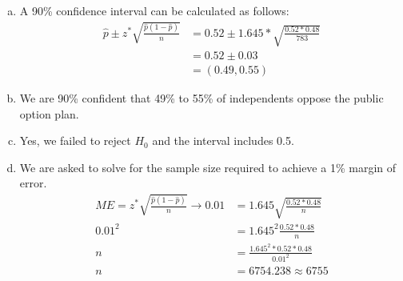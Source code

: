 %

{
\begin{enumerate}[(a)]
\item A 90\% confidence interval can be calculated as follows:
\begin{align*}
\hat{p} \pm z^* \sqrt{\frac{\hat{p} ( 1 - \hat{p})}{n}} &= 0.52 \pm 1.645 *  \sqrt{\frac{0.52 * 0.48}{783}} \\
&= 0.52 \pm 0.03 \\
&= (0.49, 0.55)
\end{align*}

\item We are 90\% confident that 49\% to 55\% of independents oppose the public option plan.

\item Yes, we failed to reject $H_0$ and the interval includes 0.5.

\item  We are asked to solve for the sample size required to achieve a 1\% margin of error. 
\begin{align*}
ME = z^* \sqrt{ \frac{\hat{p} (1-\hat{p})} {n} } \rightarrow 0.01 &= 1.645 \sqrt{ \frac{0.52 * 0.48} {n} } \\
0.01^2 &= 1.645 ^2  \frac{0.52 * 0.48}{n} \\
n &= \frac{1.645 ^2 * 0.52 * 0.48}{0.01^2} \\
n &= 6754.238 \approx 6755
\end{align*}

\end{enumerate}
}

%

